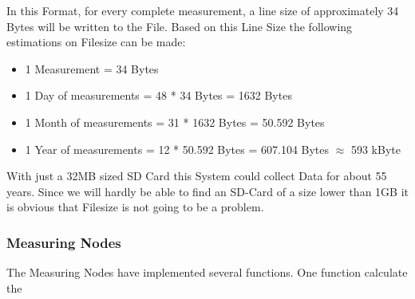 \documentclass[
	11pt,
	a4paper
]{article}%
\begin{document}
In this Format, for every complete measurement, a line size of approximately 34 Bytes will be written to the File. Based on this Line Size the following estimations on Filesize can be made:
\begin{itemize}
\item 1 Measurement = 34 Bytes
\item 1 Day of measurements = 48 * 34 Bytes = 1632 Bytes
\item 1 Month of measurements = 31 * 1632 Bytes = 50.592 Bytes
\item 1 Year of measurements = 12 * 50.592 Bytes = 607.104 Bytes $\approx$ 593 kByte
\end{itemize}
With just a 32MB sized SD Card this System could collect Data for about 55 years. Since we will hardly be able to find an SD-Card of a size lower than 1GB it is obvious that Filesize is not going to be a problem.

\subsubsection{Measuring Nodes}
The Measuring Nodes have implemented several functions. One function calculate the 
\end{document}
